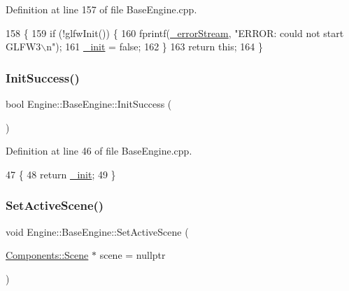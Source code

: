 Definition at line 157 of file Base\+Engine.\+cpp.


\begin{DoxyCode}
158 \{
159     \textcolor{keywordflow}{if} (!glfwInit()) \{
160         fprintf(\mbox{\hyperlink{classEngine_1_1BaseEngine_a26fd54a1ee2733f9c654af5afcfa96cf}{\_errorStream}}, \textcolor{stringliteral}{"ERROR: could not start GLFW3\(\backslash\)n"});
161         \mbox{\hyperlink{classEngine_1_1BaseEngine_a79e265845b321c0e9822fb170c564e55}{\_init}} = \textcolor{keyword}{false};
162     \}
163     \textcolor{keywordflow}{return} \textcolor{keyword}{this};
164 \}
\end{DoxyCode}
\mbox{\label{classEngine_1_1BaseEngine_a7a1c9b833049b3eb61194cab113dfe89}} 
\subsubsection{\texorpdfstring{Init\+Success()}{InitSuccess()}}
{\footnotesize\ttfamily bool Engine\+::\+Base\+Engine\+::\+Init\+Success (\begin{DoxyParamCaption}{ }\end{DoxyParamCaption})}



Definition at line 46 of file Base\+Engine.\+cpp.


\begin{DoxyCode}
47 \{
48     \textcolor{keywordflow}{return} \mbox{\hyperlink{classEngine_1_1BaseEngine_a79e265845b321c0e9822fb170c564e55}{\_init}};
49 \}
\end{DoxyCode}
\mbox{\label{classEngine_1_1BaseEngine_afc82c6a00d5a9d4714740fc5eab5db86}} 
\subsubsection{\texorpdfstring{Set\+Active\+Scene()}{SetActiveScene()}}
{\footnotesize\ttfamily void Engine\+::\+Base\+Engine\+::\+Set\+Active\+Scene (\begin{DoxyParamCaption}\item[{\mbox{\hyperlink{classEngine_1_1Components_1_1Scene}{Components\+::\+Scene}} $\ast$}]{scene = {\ttfamily nullptr} }\end{DoxyParamCaption})\hspace{0.3cm}{\ttfamily [virtual]}}



